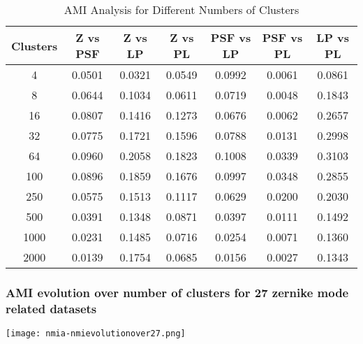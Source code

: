 \begin{table}[h!]
\centering
\begin{tabular}{|c|c|c|c|c|c|c|}
\textbf{Clusters} & \textbf{Z vs PSF} & \textbf{Z vs LP} & \textbf{Z vs PL} & \textbf{PSF vs LP} & \textbf{PSF vs PL} & \textbf{LP vs PL} \\
\hline
4  & 0.0501 & 0.0321 & 0.0549 & 0.0992 & 0.0061 & 0.0861 \\
8  & 0.0644 & 0.1034 & 0.0611 & 0.0719 & 0.0048 & 0.1843 \\ 
16 & 0.0807 & 0.1416 & 0.1273 & 0.0676 & 0.0062 & 0.2657 \\ 
32 & 0.0775 & 0.1721 & 0.1596 & 0.0788 & 0.0131 & 0.2998 \\ 
64 & 0.0960 & 0.2058 & 0.1823 & 0.1008 & 0.0339 & 0.3103 \\ 
100 & 0.0896 & 0.1859 & 0.1676 & 0.0997 & 0.0348 & 0.2855 \\ 
250 & 0.0575 & 0.1513 & 0.1117 & 0.0629 & 0.0200 & 0.2030 \\ 
500 & 0.0391 & 0.1348 & 0.0871 & 0.0397 & 0.0111 & 0.1492 \\ 
1000 & 0.0231 & 0.1485 & 0.0716 & 0.0254 & 0.0071 & 0.1360 \\ 
2000 & 0.0139 & 0.1754 & 0.0685 & 0.0156 & 0.0027 & 0.1343 \\ 
\hline
\end{tabular}
\caption{AMI Analysis for Different Numbers of Clusters}
\end{table}
		\FloatBarrier
		
		
	\subsubsection{AMI evolution over number of clusters for 27 zernike mode related datasets}
		\begin{figure*}[ht!]
			\centering
			\texttt{[image: nmia-nmievolutionover27.png]}
		\end{figure*}
		

